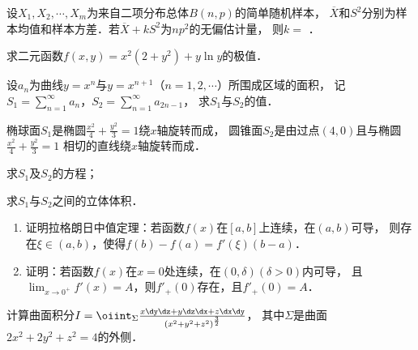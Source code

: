 \documentclass[plain,noanswer,medmath]{../../template/jnuexam}
\begin{document}
\begin{problem}
设$X_1,X_2, \cdots ,X_m$为来自二项分布总体$B\left(n,p \right)$的简单随机样本，
$\overline{X}$和$S^2$分别为样本均值和样本方差．若$\overline{X} + kS^2$为$np^2$的无偏估计量，
则$k =$ \fillin{}．
\end{problem}




\begin{problem}[points=9]
求二元函数$f(x,y) = x^2\left(2 + y^2 \right) + y\ln y$的极值．
\end{problem}


\begin{problem}[points=9]
设$a_n$为曲线$y = x^n$与$y = x^{n + 1}$（$n = 1,2, \cdots$）所围成区域的面积，
记$S_1 = \sum_{n = 1}^{\infty}a_n$，$S_2 = \sum_{n = 1}^{\infty}a_{2n - 1}$，
求$S_1$与$S_2$的值．
\end{problem}


\begin{problem}[points=11]
椭球面$S_1$是椭圆$\frac{x^2}{4} + \frac{y^2}{3} = 1$绕$x$轴旋转而成，
圆锥面$S_2$是由过点$\left(4,0 \right)$且与椭圆$\frac{x^2}{4} + \frac{y^2}{3} = 1$
相切的直线绕$x$轴旋转而成．\par
\begin{enumerate*}
\item 求$S_1$及$S_2$的方程；
\item 求$S_1$与$S_2$之间的立体体积．
\end{enumerate*}
\end{problem}


\begin{problem}[points=11]
\begin{enumerate}
\item 证明拉格朗日中值定理：若函数$f(x)$在$\left[a,b \right]$上连续，在$(a,b)$可导，
      则存在$\xi \in \left(a,b \right)$，使得$f(b) - f(a) = f'\left(\xi \right)(b - a)$．
\item 证明：若函数$f(x)$在$x = 0$处连续，在$\left(0,\delta \right)\left(\delta > 0 \right)$内可导，
      且$\lim_{x \to 0^+} f'(x) = A$，则$f'_+(0)$存在，且$f'_+(0) = A$．
\end{enumerate}
\end{problem}


\begin{problem}[points=10]
计算曲面积分$I = \oiint_{\Sigma}\frac{x\dy\dz + y\dz\dx + z\dx\dy}{\left(x^2+y^2+z^2\right)^{\frac{3}{2}}}$，
其中$\Sigma$是曲面$2x^2 + 2y^2 + z^2 = 4$的外侧．
\end{problem}
\end{document}
